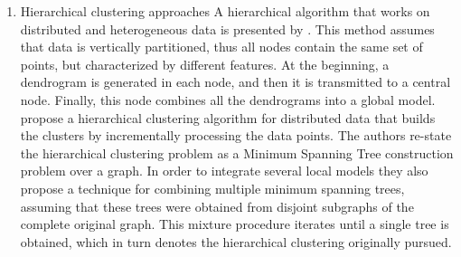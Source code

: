 \documentclass[10pt]{article}
\begin{document}
\begin{enumerate}
\item Hierarchical clustering approaches
A hierarchical algorithm that works on distributed and heterogeneous data is presented by \cite{JK00}. This method assumes that data is vertically partitioned, thus all nodes contain the same set of points, but characterized by different features. At the beginning, a dendrogram is generated in each node, and then it is transmitted to a central node. Finally, this node combines all the dendrograms into a global model.  
\cite{JCHAC15} propose a hierarchical clustering algorithm for distributed data that builds the clusters by incrementally processing the data points. The authors re-state the hierarchical clustering problem as a Minimum Spanning Tree construction problem over a graph. In order to integrate several local models they also propose a technique for combining multiple minimum spanning trees, assuming that these trees were obtained from disjoint subgraphs of the complete original graph. This mixture procedure iterates until a single tree is obtained, which in turn denotes the hierarchical clustering originally pursued. 
\end{enumerate}

\end{document}
